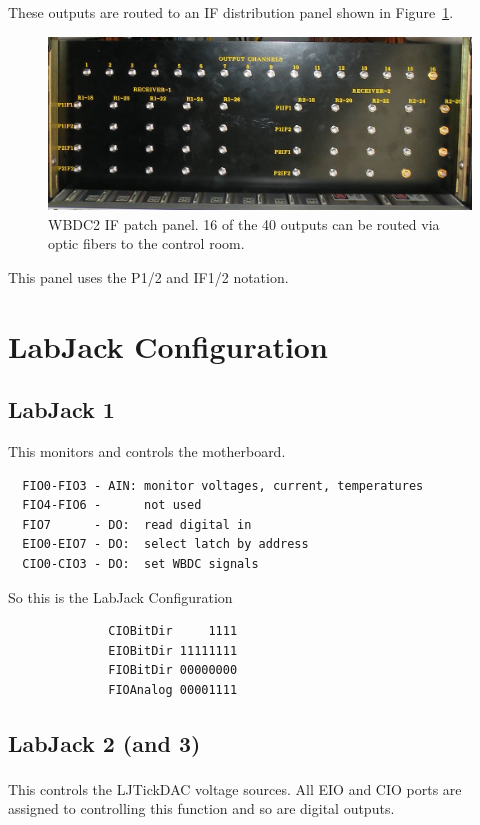 \documentclass[letterpaper,11pt]{book}
\begin{document}
These outputs are routed to an IF distribution panel shown in 
Figure~\ref{fig:WBDCpatch}.
\begin{figure}[h!tb]
  \begin{center}
    \includegraphics[width=6in]{WBDC_output_signals.jpg}
    \caption[WBDC2 output patch panel]{\label{fig:WBDCpatch}WBDC2 IF patch 
    panel. 16 of the
    40 outputs can be routed via optic fibers to the control room.}
  \end{center}
\end{figure}
This panel uses the P1/2 and IF1/2 notation.



\chapter{LabJack Configuration}\label{labjack}

\section{LabJack 1}

This monitors and controls the motherboard.
\begin{verbatim}
  FIO0-FIO3 - AIN: monitor voltages, current, temperatures
  FIO4-FIO6 -      not used
  FIO7      - DO:  read digital in
  EIO0-EIO7 - DO:  select latch by address
  CIO0-CIO3 - DO:  set WBDC signals
\end{verbatim}
So this is the LabJack Configuration
\begin{verbatim}
              CIOBitDir     1111
              EIOBitDir 11111111
              FIOBitDir 00000000
              FIOAnalog 00001111
\end{verbatim}

\section{LabJack 2 (and 3)}

This controls the LJTickDAC\textsuperscript{\textregistered} voltage sources.
All EIO and CIO ports are assigned to controlling this function and so are
digital outputs.
\end{document}
